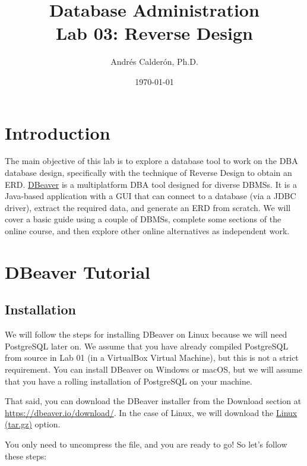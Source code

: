 \documentclass{article}
\title{Database Administration \\ Lab 03: Reverse Design}
\author{Andrés Calderón, Ph.D.}
\date{\today}
\begin{document}
\maketitle

\section{Introduction}
The main objective of this lab is to explore a database tool to work on the DBA database design, specifically with the technique of Reverse Design to obtain an ERD. \href{https://dbeaver.io/}{DBeaver} is a multiplatform DBA tool designed for diverse DBMSs. It is a Java-based application with a GUI that can connect to a database (via a JDBC driver), extract the required data, and generate an ERD from scratch. We will cover a basic guide using a couple of DBMSs, complete some sections of the online course, and then explore other online alternatives as independent work.


\section{DBeaver Tutorial}
\subsection{Installation}
We will follow the steps for installing DBeaver on Linux because we will need PostgreSQL later on. We assume that you have already compiled PostgreSQL from source in Lab 01 (in a VirtualBox Virtual Machine), but this is not a strict requirement. You can install DBeaver on Windows or macOS, but we will assume that you have a rolling installation of PostgreSQL on your machine.

That said, you can download the DBeaver installer from the Download section at \url{https://dbeaver.io/download/}. In the case of Linux, we will download the \href{https://dbeaver.io/files/dbeaver-ce-latest-linux.gtk.x86_64.tar.gz}{Linux (tar.gz)} option.

You only need to uncompress the file, and you are ready to go! So let's follow these steps:
\end{document}

